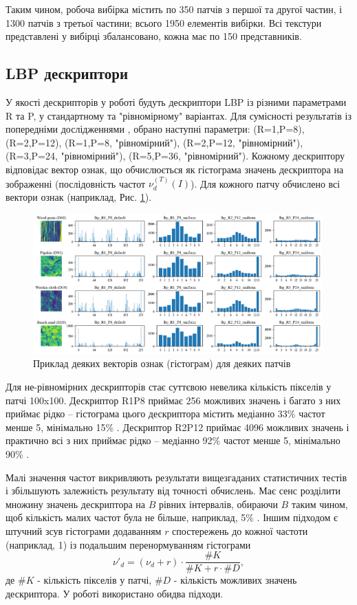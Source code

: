 Таким чином, робоча вибірка містить по 350 патчів з першої та другої частин, і 1300 патчів з третьої частини; всього 1950 елементів вибірки.
Всі текстури представлені у вибірці збалансовано, кожна має по 150 представників.

\subsection{LBP дескриптори}\label{section2.1b}

У якості дескрипторів у роботі будуть дескриптори LBP із різними параметрами R та P, у стандартному та "рівномірному" варіантах.
Для сумісності результатів із попередніми дослідженнями \cite{ojala2002,fastlbp2024}, обрано наступні параметри:
(R=1,P=8), (R=2,P=12), (R=1,P=8, "рівномірний"), (R=2,P=12, "рівномірний"), (R=3,P=24, "рівномірний"), (R=5,P=36, "рівномірний").
Кожному дескриптору відповідає вектор ознак, що обчислюється як гістограма значень дескриптора на зображенні (послідовність частот $\nu^{(T)}_d(I)$).
Для кожного патчу обчислено всі вектори ознак (наприклад, Рис. \ref{fig:example-features}).

\begin{figure}[h]
    \centering
    \includegraphics[width=0.99\textwidth]{img/example_features.png}
    \caption{
        Приклад деяких векторів ознак (гістограм) для деяких патчів
    }
    \label{fig:example-features}
\end{figure}

Для не-рівномірних дескрипторів стає суттєвою невелика кількість пікселів у патчі 100x100.
Дескриптор R1P8 приймає 256 можливих значень і багато з них приймає рідко -- гістограма цього дескриптора містить медіанно 33\% частот менше 5, мінімально 15\% .
Дескриптор R2P12 приймає 4096 можливих значень і практично всі з них приймає рідко -- медіанно 92\% частот менше 5, мінімально 90\% .

Малі значення частот викривляють результати вищезгаданих статистичних тестів і збільшують залежність результату від точності обчислень.
Має сенс розділити множину значень дескриптора на $B$ рівних інтервалів, обираючи $B$ таким чином, щоб кількість малих частот була не більше, наприклад, 5\% \cite{ojala2002}.
Іншим підходом є штучний зсув гістограми додаванням $r$ спостережень до кожної частоти (наприклад, 1) із подальшим перенормуванням гістограми
\begin{equation*}
    \nu'_d = (\nu_d + r) \cdot \frac{\# K}{\# K + r \cdot \# D},
\end{equation*} 
де $\# K$ - кількість пікселів у патчі, $\# D$ - кількість можливих значень дескриптора. У роботі використано обидва підходи.

